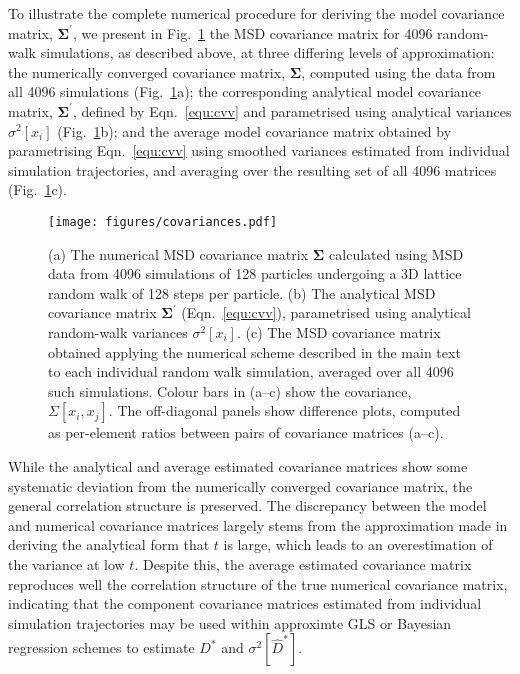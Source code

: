 \documentclass[reprint,superscriptaddress,nobibnotes,amsmath,amssymb,aps,prx,hidelinks]{revtex4-2}
\newcommand{\oMSDi}{\ensuremath{x_i}}
\newcommand{\oMSDj}{\ensuremath{x_j}}
\newcommand{\Dest}{\ensuremath{\widehat{D}^*}}
\newcommand{\D}{\ensuremath{D^*}}
\newcommand{\var}[1]{\ensuremath{\sigma^2[#1]}}
\begin{document}
To illustrate the complete numerical procedure for deriving the model covariance matrix, $\bm{\Sigma^\prime}$, we present in Fig.~\ref{fig:covariances} the MSD covariance matrix for \num{4096} random-walk simulations, as described above, at three differing levels of approximation:
the numerically converged covariance matrix, $\bm{\Sigma}$, computed using the data from all \num{4096} simulations (Fig.~\ref{fig:covariances}a);
the corresponding analytical model covariance matrix, $\mathbf{\Sigma^\prime}$, defined by Eqn.~\ref{equ:cvv} and parametrised using analytical variances $\var{\oMSDi}$ (Fig.~\ref{fig:covariances}b); and the average model covariance matrix obtained by parametrising Eqn.~\ref{equ:cvv} using smoothed variances estimated from individual simulation trajectories, and averaging over the resulting set of all \num{4096} matrices (Fig.~\ref{fig:covariances}c).
%
\begin{figure}
    \centering
    \texttt{[image: figures/covariances.pdf]}
    \caption{
        (a) The numerical MSD covariance matrix $\bm{\Sigma}$ calculated using MSD data from \num{4096} simulations of \num{128} particles undergoing a 3D lattice random walk of \num{128} steps per particle.
        (b) The analytical MSD covariance matrix $\bm{\Sigma^\prime}$ (Eqn.~\ref{equ:cvv}), parametrised using analytical random-walk variances $\var{\oMSDi}$.
        (c) The MSD covariance matrix obtained applying the numerical scheme described in the main text to each individual random walk simulation, averaged over all \num{4096} such simulations.
        Colour bars in (a--c) show the covariance, $\Sigma\left[\oMSDi, \oMSDj\right]$.
        The off-diagonal panels show difference plots, computed as per-element ratios between pairs of covariance matrices (a--c).
    }
    \label{fig:covariances}
\end{figure}
%

While the analytical and average estimated covariance matrices show some systematic deviation from the numerically converged covariance matrix, the general correlation structure is preserved.
The discrepancy between the model and numerical covariance matrices largely stems from the approximation made in deriving the analytical form that $t$ is large, which leads to an overestimation of the variance at low $t$.
Despite this, the average estimated covariance matrix reproduces well the correlation structure of the true numerical covariance matrix, indicating that the component covariance matrices estimated from individual simulation trajectories may be used within approximte GLS or Bayesian regression schemes to estimate $\D$ and $\var{\Dest}$.
\end{document}
